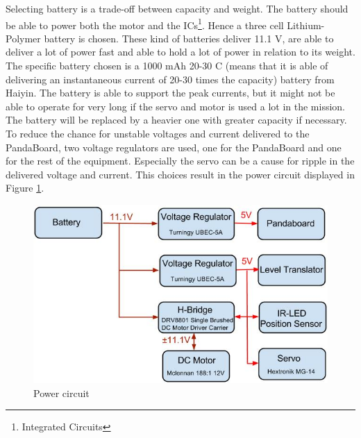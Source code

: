 Selecting battery is a trade-off between capacity and weight. The battery should be able to power both the motor and the ICs\footnote{Integrated Circuits}. Hence a three cell Lithium-Polymer battery is chosen. These kind of batteries deliver 11.1 V, are able to deliver a lot of power fast and able to hold a lot of power in relation to its weight. The specific battery chosen is a 1000 mAh 20-30 C (means that it is able of delivering an instantaneous current of 20-30 times the capacity) battery from Haiyin. The battery is able to support the peak currents, but it might not be able to operate for very long if the servo and motor is used a lot in the mission. The battery will be replaced by a heavier one with greater capacity if necessary.\\
\newline
To reduce the chance for unstable voltages and current delivered to the PandaBoard, two voltage regulators are used, one for the PandaBoard and one for the rest of the equipment. Especially the servo can be a cause for ripple in the delivered voltage and current. This choices result in the power circuit displayed in Figure \ref{powerCircuit}.
\begin{figure}[H]
\centering
\includegraphics[width = 16cm]{fig/krets/power.jpg}
\caption{Power circuit}
\label{powerCircuit}
\end{figure}
